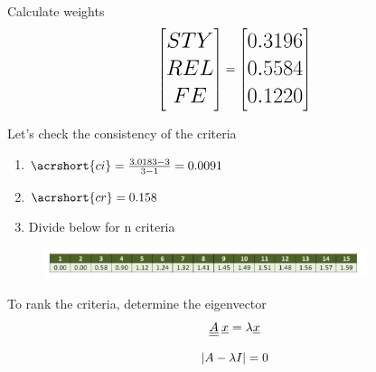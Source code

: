 \documentclass[aspectratio=1610,pdftex,dvipsnames,compress,xcolor={dvipsnames}]{beamer}
\newcommand{\acs}{\acrshort} %
\begin{document}
\begin{frame}{Calculate weights}
    \begin{equation}
        \LARGE
        \begin{bmatrix} STY \\ REL \\ FE \end{bmatrix} = \begin{bmatrix} 0.3196 \\ 0.5584 \\ 0.1220 \end{bmatrix}
    \end{equation}
\end{frame}


\begin{frame}{Let's check the consistency of the criteria}
    \begin{enumerate}[series=outerlist,topsep=0pt,itemsep=1pt,leftmargin=*,label=(\arabic*)]
        \item[]$\acs{ci} = \frac{3.0183-3}{3-1} = 0.0091$
        \item[]$\acs{cr} = 0.158$
            \vspace{0.25in}
        \item[]Divide below for n criteria
    \end{enumerate}

    \begin{figure}
        \centering
        \includegraphics[width=0.85\textwidth]{cr.table.jpg}
    \end{figure}
\end{frame}


\begin{frame}{To rank the criteria, determine the eigenvector}
    \begin{equation}
        \LARGE
        \underline{\underline{A}} \: \underline{x} = \lambda \underline{x}
    \end{equation}

    \begin{equation}
        \LARGE
        |A -\lambda I| = 0
    \end{equation}
\end{frame}
\end{document}
